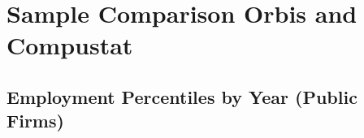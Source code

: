 \documentclass[12pt,notitlepage]{article}
\begin{document}
%         



\FloatBarrier
\section{Sample Comparison Orbis and Compustat} %
\label{sec:compustat_vs_orbis}
\FloatBarrier

\subsection{Employment Percentiles by Year (Public Firms)}
\end{document}
